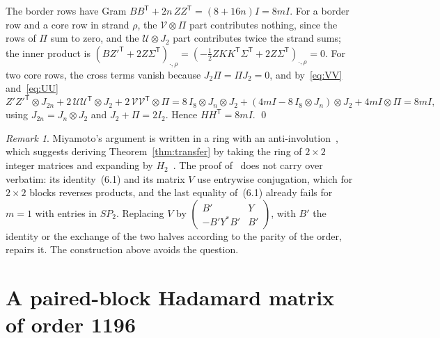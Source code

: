 \documentclass[10pt]{article}
\theoremstyle{definition}
\theoremstyle{remark}
\newtheorem*{remark}{Remark}
\newcommand{\tr}{^{\mathsf T}}
\newcommand{\cU}{\mathcal U}
\newcommand{\cV}{\mathcal V}
\begin{document}
The border rows have Gram $BB\tr+2n\,ZZ\tr=(8+16n)I=8mI$. For a border row and a core row in strand $\rho$, the $\cV\otimes\Pi$ part contributes nothing, since the rows of $\Pi$ sum to zero, and the $\cU\otimes J_2$ part contributes twice the strand sums; the inner product is $(BZ'^{\mathsf T}+2Z\Sigma\tr)_{\cdot,\rho}=(-\tfrac12ZKK\tr\Sigma\tr+2Z\Sigma\tr)_{\cdot,\rho}=0$. For two core rows, the cross terms vanish because $J_2\Pi=\Pi J_2=0$, and by~\eqref{eq:VV} and~\eqref{eq:UU}
\[
Z'Z'^{\mathsf T}\otimes J_{2n}+2\,\cU\cU\tr\otimes J_2+2\,\cV\cV\tr\otimes \Pi
=8\,I_8\otimes J_n\otimes J_2+(4mI-8\,I_8\otimes J_n)\otimes J_2+4mI\otimes \Pi=8mI,
\]
using $J_{2n}=J_n\otimes J_2$ and $J_2+\Pi=2I_2$. Hence $HH\tr=8mI$. \qed

\begin{remark}
Miyamoto's argument is written in a ring with an anti-involution~\cite[p.~97]{Mi91}, which suggests deriving Theorem~\ref{thm:transfer} by taking the ring of $2\times2$ integer matrices and expanding by $H_2$~\cite[Theorem~5]{Cr95}. The proof of~\cite[Theorem~7]{Mi91} does not carry over verbatim: its identity~(6.1) and its matrix $V$ use entrywise conjugation, which for $2\times2$ blocks reverses products, and the last equality of~(6.1) already fails for $m=1$ with entries in $SP_2$. Replacing $V$ by $\left(\begin{smallmatrix}B'&Y\\-B'Y^*B'&B'\end{smallmatrix}\right)$, with $B'$ the identity or the exchange of the two halves according to the parity of the order, repairs it. The construction above avoids the question.
\end{remark}

\section{A paired-block Hadamard matrix of order 1196}\label{sec:paired}
\end{document}
